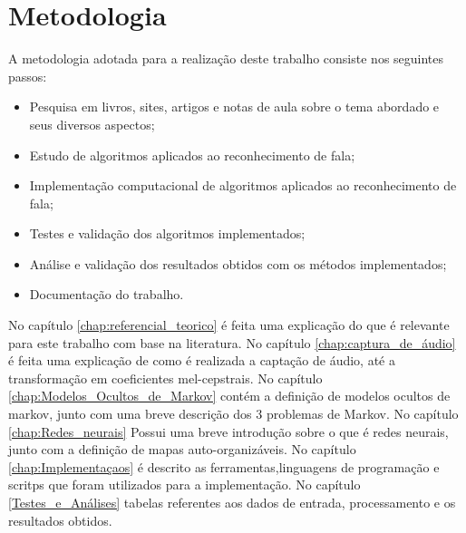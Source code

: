 \section{Metodologia}

\quad A metodologia adotada para a realização deste trabalho consiste nos seguintes passos:

\begin{itemize}
\item Pesquisa em livros, sites, artigos e notas de aula sobre o tema abordado e seus diversos aspectos;
\item Estudo de algoritmos aplicados ao reconhecimento de fala;
\item Implementação computacional de algoritmos aplicados ao reconhecimento de fala;
\item Testes e validação dos algoritmos implementados;
\item Análise e validação dos resultados obtidos com os métodos implementados;
\item Documentação do trabalho. 

\end{itemize}

\quad No capítulo \ref{chap:referencial_teorico} é feita uma explicação do que é relevante para este trabalho com base na literatura. No capítulo \ref{chap:captura_de_áudio} é feita uma explicação de como é realizada a captação de áudio, até a transformação em coeficientes mel-cepstrais. No capítulo \ref{chap:Modelos_Ocultos_de_Markov} contém a definição de modelos ocultos de markov, junto com uma breve descrição dos 3 problemas de Markov. No capítulo \ref{chap:Redes_neurais} Possui uma breve introdução sobre o que é redes neurais, junto com a definição de mapas auto-organizáveis. No capítulo \ref{chap:Implementaçaos} é descrito as ferramentas,linguagens de programação e scritps que foram utilizados para a implementação. No capítulo \ref{Testes_e_Análises} tabelas referentes aos dados de entrada,  processamento e os resultados obtidos.

























